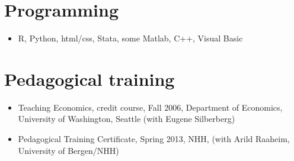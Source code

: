 \documentclass[margin]{res}
\begin{document}
\begin{resume}

\section{Programming}
\begin{itemize}
  \item[] R, Python, html/css, Stata, some Matlab, C++, Visual Basic
\end{itemize}

\section{Pedagogical training}
\begin{itemize}
\setlength{\itemsep}{10pt}
\item[] Teaching Economics, credit course, Fall 2006, Department of Economics, University of Washington, Seattle (with Eugene Silberberg)

\item[] Pedagogical Training Certificate, Spring 2013, NHH, (with Arild Raaheim, University of Bergen/NHH)
\end{itemize}

\end{resume}
\end{document}
